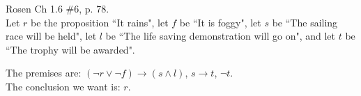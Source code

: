 \begin{questions}



{}  Rosen Ch 1.6 \#6, p. 78.\\
Let $r$ be the proposition ``It rains", let $f$ be ``It is foggy",
    let $s$ be ``The sailing race will be held", let $l$ be ``The life
    saving demonstration will go on", and let $t$ be ``The trophy will
    be awarded".
    \ifprintanswers
        \vspace{-10pt}
    \fi
\begin{solution}
    The premises are: $(\neg r \vee \neg f) \rightarrow (s \wedge l)$, $s \rightarrow t$, $\neg t$. \\
    The conclusion we want is: $r$.


\end{solution}
\end{questions}
